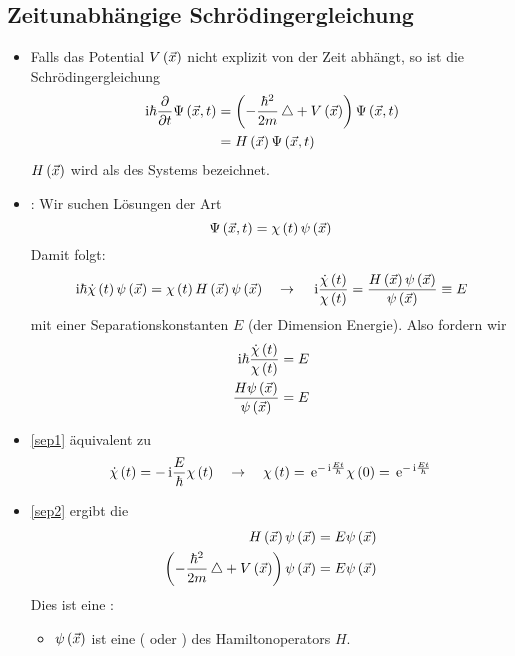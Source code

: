 \subsection{Zeitunabhängige Schrödingergleichung}

\begin{itemize}
	\item Falls das Potential $V\left(\vec{x}\right)$ nicht explizit von der Zeit abhängt, so ist die Schrödingergleichung
	\begin{align}
		\, \text{i}\hbar\frac{\partial }{\partial t}\Psi\left(\vec{x},t\right) & = \left( -\frac{\hbar^2}{2m}\mathop{}\!\mathbin\bigtriangleup + V\left(\vec{x}\right) \right)\Psi\left(\vec{x},t\right) \\
		& = H\left(\vec{x}\right)\Psi\left(\vec{x},t\right)
	\end{align}
	$H\left(\vec{x}\right)$ wird als  des Systems bezeichnet.
	\item {}: Wir suchen Lösungen der Art
	\begin{equation}
		\Psi\left(\vec{x},t\right) = \chi\left(t\right)\psi\left(\vec{x}\right)
	\end{equation}
	Damit folgt:
	\begin{equation}
		\, \text{i}\hbar\dot{\chi}\left(t\right)\psi\left(\vec{x}\right) = \chi\left(t\right)H\left(\vec{x}\right)\psi\left(\vec{x}\right) \quad \rightarrow \quad \, \text{i}\frac{\dot{\chi}\left(t\right)}{\chi\left(t\right)} = \frac{H\left(\vec{x}\right)\psi\left(\vec{x}\right)}{\psi\left(\vec{x}\right)} \equiv E
	\end{equation}
	mit einer Separationskonstanten $E$ (der Dimension Energie). Also fordern wir
	\begin{align}
		\, \text{i}\hbar\frac{\dot{\chi}\left(t\right)}{\chi\left(t\right)} = E \label{sep1} \\
		\frac{H\psi\left(\vec{x}\right)}{\psi\left(\vec{x}\right)} = E \label{sep2}
	\end{align}
	\item \eqref{sep1} äquivalent zu
	\begin{equation}
		\dot{\chi}\left(t\right) = - \, \text{i} \frac{E}{\hbar}\chi\left(t\right) \quad \rightarrow \quad \chi\left(t\right) = \, \text{e}^{-\, \text{i}\frac{E t}{\hbar}}\chi\left(0\right) = \, \text{e}^{-\, \text{i}\frac{E t}{\hbar}}
	\end{equation}
	\item \eqref{sep2} ergibt die 
	\begin{align}
		H\left(\vec{x}\right)\psi\left(\vec{x}\right) & = E \psi\left(\vec{x}\right) \\
		\left( -\frac{\hbar^2}{2m}\mathop{}\!\mathbin\bigtriangleup + V\left(\vec{x}\right) \right)\psi\left(\vec{x}\right) & = E \psi\left(\vec{x}\right)
	\end{align}
	Dies ist eine :
	\begin{itemize}
		\item $\psi\left(\vec{x}\right)$ ist eine  ( oder ) des Hamiltonoperators $H$.

\end{itemize}
\end{itemize}
